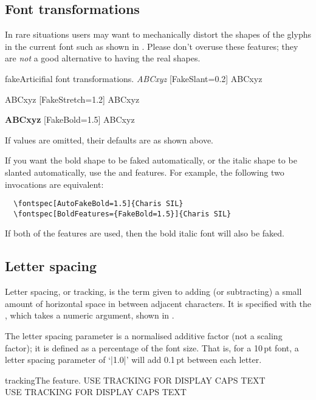 \documentclass[a4paper]{l3doc}
\begin{document}
\subsection{Font transformations}

In rare situations users may want to mechanically distort the shapes of the glyphs in the current font such as shown in . Please don't overuse these features; they are \emph{not} a good alternative to having the real shapes.

\begin{Xexample}{fake}{Articifial font transformations.}
   \emph{ABCxyz} \quad
  [FakeSlant=0.2] ABCxyz

    ABCxyz \quad
  [FakeStretch=1.2] ABCxyz

   \textbf{ABCxyz} \quad
  [FakeBold=1.5] ABCxyz
\end{Xexample}

If values are omitted, their defaults are as shown above.

If you want the bold shape to be faked automatically, or the italic shape
to be slanted automatically, use the  and
 features. For example, the following two invocations
are equivalent:
\begin{Verbatim}
  \fontspec[AutoFakeBold=1.5]{Charis SIL}
  \fontspec[BoldFeatures={FakeBold=1.5}]{Charis SIL}
\end{Verbatim}
If both of the  features are used, then the bold italic
font will also be faked.


\subsection{Letter spacing}
Letter spacing, or tracking, is the term given to adding (or subtracting) a small amount of horizontal space in between adjacent characters. It is specified with the , which takes a numeric argument,
shown in .

The letter spacing parameter is a normalised additive factor (not a scaling factor); it is defined as a percentage of the font size. That is, for a 10\,pt font, a letter spacing parameter of `|1.0|' will add 0.1\,pt between each letter.

\begin{Xexample}{tracking}{The  feature.}
  USE TRACKING FOR DISPLAY CAPS TEXT \\
  USE TRACKING FOR DISPLAY CAPS TEXT
\end{Xexample}
\end{document}
